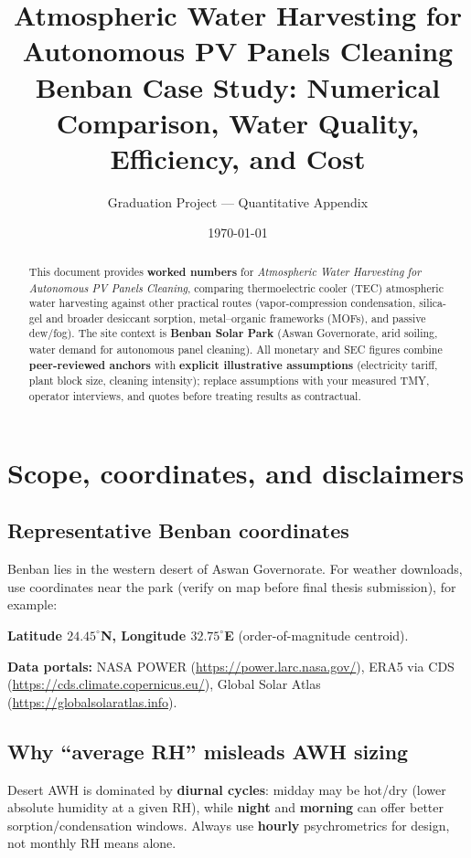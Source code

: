 \documentclass[11pt,a4paper]{article}
\title{\textbf{Atmospheric Water Harvesting for Autonomous PV Panels Cleaning}\\
\large Benban Case Study: Numerical Comparison, Water Quality, Efficiency, and Cost}
\author{Graduation Project --- Quantitative Appendix}
\date{\today}
\begin{document}
\maketitle

\begin{abstract}
\noindent
This document provides \textbf{worked numbers} for \textit{Atmospheric Water Harvesting for Autonomous PV Panels Cleaning}, comparing thermoelectric cooler (TEC) atmospheric water harvesting against other practical routes (vapor-compression condensation, silica-gel and broader desiccant sorption, metal--organic frameworks (MOFs), and passive dew/fog). The site context is \textbf{Benban Solar Park} (Aswan Governorate, arid soiling, water demand for autonomous panel cleaning). All monetary and SEC figures combine \textbf{peer-reviewed anchors} with \textbf{explicit illustrative assumptions} (electricity tariff, plant block size, cleaning intensity); replace assumptions with your measured TMY, operator interviews, and quotes before treating results as contractual.
\end{abstract}

\tableofcontents
\newpage

\section{Scope, coordinates, and disclaimers}

\subsection{Representative Benban coordinates}
Benban lies in the western desert of Aswan Governorate. For weather downloads, use coordinates near the park (verify on map before final thesis submission), for example:
\begin{center}
\textbf{Latitude $24.45^\circ$N, Longitude $32.75^\circ$E} (order-of-magnitude centroid).
\end{center}
\textbf{Data portals:} NASA POWER (\url{https://power.larc.nasa.gov/}), ERA5 via CDS (\url{https://cds.climate.copernicus.eu/}), Global Solar Atlas (\url{https://globalsolaratlas.info}).

\subsection{Why ``average RH'' misleads AWH sizing}
Desert AWH is dominated by \textbf{diurnal cycles}: midday may be hot/dry (lower absolute humidity at a given RH), while \textbf{night} and \textbf{morning} can offer better sorption/condensation windows. Always use \textbf{hourly} psychrometrics for design, not monthly RH means alone.
\end{document}
